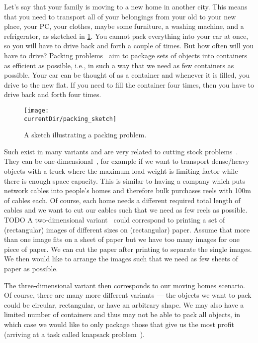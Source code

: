 %
%
Let's say that your family is moving to a new home in another city.
This means that you need to transport all of your belongings from your old to your new place, your PC, your clothes, maybe some furniture, a washing machine, and a refrigerator, as sketched in \cref{fig:packing_sketch}.
You cannot pack everything into your car at once, so you will have to drive back and forth a couple of times.
But how often will you have to drive?
Packing problems~\cite{S2018ITCAPOPMASM,DF1992CAPIPADATAB} aim to package sets of objects into containers as efficient as possible, i.e., in such a way that we need as few containers as possible.
Your car can be thought of as a container and whenever it is filled, you drive to the new flat.
If you need to fill the container four times, then you have to drive back and forth four times.%
%
\begin{figure}%
\centering%
\texttt{[image: \\currentDir/packing\_sketch]}%
\caption{A sketch illustrating a packing problem.}%
\label{fig:packing_sketch}%
\end{figure}

Such  exist in many variants and are very related to cutting stock problems~\cite{DF1992CAPIPADATAB}.
They can be one-dimensional~\cite{DIM2016BPACSPMMAEA}, for example if we want to transport dense/heavy objects with a truck where the maximum load weight is limiting factor while there is enough space capacity.
This is similar to having a company which puts network cables into people's homes and therefore bulk purchases reels with 100m of cables each.
Of course, each home needs a different required total length of cables and we want to cut our cables such that we need as few reels as possible.
TODO
A two-dimensional variant~\cite{LMM2002TDPPAS} could correspond to printing a set of (rectangular) images of different sizes on (rectangular) paper.
Assume that more than one image fits on a sheet of paper but we have too many images for one piece of paper.
We can cut the paper after printing to separate the single images.
We then would like to arrange the images such that we need as few sheets of paper as possible.

The three-dimensional variant then corresponds to our moving homes scenario.
Of course, there are many more different variants --- the objects we want to pack could be circular, rectangular, or have an arbitrary shape.
We may also have a limited number of containers and thus may not be able to pack all objects, in which case we would like to only package those that give us the most profit (arriving at a task called knapsack problem~\cite{MT1990KPAACI}).%
%
\endhsection%
%
